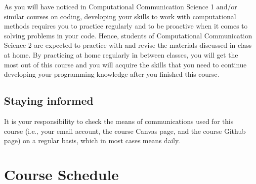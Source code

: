 \documentclass[a4paper,10pt]{report}
\begin{document}
	As you will have noticed in Computational Communication Science 1 and/or similar courses on coding, developing your skills to work with computational methods requires you to practice regularly and to be proactive when it comes to solving problems in your code. Hence, students of Computational Communication Science 2 are expected to practice with and revise the materials discussed in class at home. By practicing at home regularly in between classes, you will get the most out of this course and you will acquire the skills that you need to continue developing your programming knowledge after you finished this course.
	
	\section{Staying informed}
	It is your responsibility to check the means of communications used for this course (i.e., your email account, the course Canvas page, and the course Github page) on a regular basis, which in most cases means daily.
	
	

	

	
	
	\chapter{Course Schedule}
	
	
	
%	
%	
	
	
	
\end{document}
